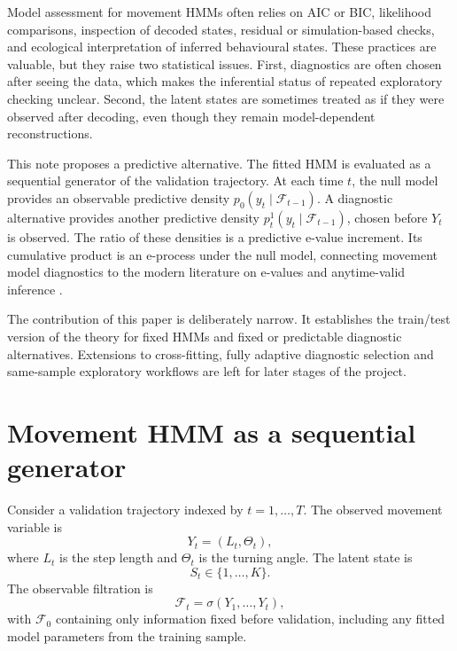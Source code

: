 \documentclass[11pt]{article}
\begin{document}
Model assessment for movement HMMs often relies on AIC or BIC, likelihood comparisons, inspection of decoded states, residual or simulation-based checks, and ecological interpretation of inferred behavioural states. These practices are valuable, but they raise two statistical issues. First, diagnostics are often chosen after seeing the data, which makes the inferential status of repeated exploratory checking unclear. Second, the latent states are sometimes treated as if they were observed after decoding, even though they remain model-dependent reconstructions.

This note proposes a predictive alternative. The fitted HMM is evaluated as a sequential generator of the validation trajectory. At each time $t$, the null model provides an observable predictive density $p_0(y_t \mid \mathcal F_{t-1})$. A diagnostic alternative provides another predictive density $p_t^1(y_t \mid \mathcal F_{t-1})$, chosen before $Y_t$ is observed. The ratio of these densities is a predictive e-value increment. Its cumulative product is an e-process under the null model, connecting movement model diagnostics to the modern literature on e-values and anytime-valid inference \citep{vovk_wang_2021_evalues,howard_2020_time_uniform}.

The contribution of this paper is deliberately narrow. It establishes the train/test version of the theory for fixed HMMs and fixed or predictable diagnostic alternatives. Extensions to cross-fitting, fully adaptive diagnostic selection and same-sample exploratory workflows are left for later stages of the project.

\section{Movement HMM as a sequential generator}

Consider a validation trajectory indexed by $t = 1, \ldots, T$. The observed movement variable is
\begin{equation}
Y_t = (L_t, \Theta_t),
\end{equation}
where $L_t$ is the step length and $\Theta_t$ is the turning angle. The latent state is
\begin{equation}
S_t \in \{1, \ldots, K\}.
\end{equation}
The observable filtration is
\begin{equation}
\mathcal F_t = \sigma(Y_1, \ldots, Y_t),
\end{equation}
with $\mathcal F_0$ containing only information fixed before validation, including any fitted model parameters from the training sample.
\end{document}
